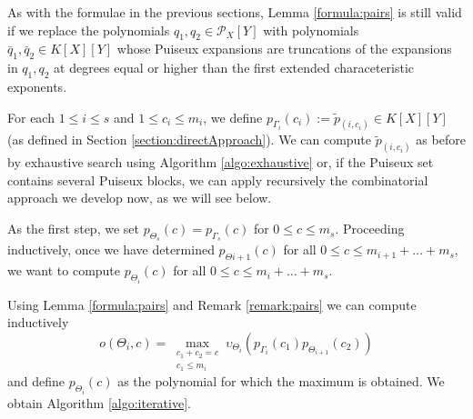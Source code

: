 \documentclass[a4paper,11pt]{amsart}%
\theoremstyle{definition}
\theoremstyle{plain}
\theoremstyle{remark}
\newcommand{\Px}{{\mathcal{P}_X}}
\begin{document}
As with the formulae in the previous sections, Lemma \ref{formula:pairs} is still valid if we replace the polynomials $q_1, q_2 \in \Px[Y]$ with polynomials $\bar q_1, \bar q_2 \in K[X][Y]$ whose Puiseux expansions are truncations of the expansions in $q_1, q_2$ at degrees equal or higher than the first extended characeteristic exponents.

For each $1 \le i \le s$ and $1 \le c_i \le m_i$, we define $p_{\Gamma_{i}}(c_i) := \tilde p_{(i, c_i)} \in K[X][Y]$ (as defined in Section \ref{section:directApproach}).
We can compute $\tilde p_{(i, c_i)}$ as before by exhaustive search using Algorithm \ref{algo:exhaustive} or, if the Puiseux set contains several Puiseux blocks, we can apply recursively the combinatorial approach  we develop now, as we will see below.

As the first step, we set $p_{\Theta_{s}}(c) = p_{\Gamma_{s}}(c)$ for $0 \leq c \leq m_{s}$.
Proceeding inductively, once we have determined $p_{\Theta{i+1}}(c)$ for
all $0 \leq c \leq m_{i+1} + \dots+ m_{s}$, we want to compute
$p_{\Theta_{i}}(c)$ for all $0 \leq c \leq m_{i} + \dots+ m_{s}$.

Using Lemma \ref{formula:pairs} and Remark \ref{remark:pairs} we can compute inductively
\[
o(\Theta_{i}, c) = \max_{\substack{c_{1} + c_{2} = c \\ c_{1} \le m_i}} \upsilon_{{\Theta_{i}}%
}(p_{\Gamma_{i}}(c_{1})p_{\Theta_{i+1}}(c_{2}))
\]
and define $p_{\Theta_{i}}(c)$ as the polynomial for which the maximum is obtained.
We obtain Algorithm \ref{algo:iterative}.





\end{document}
